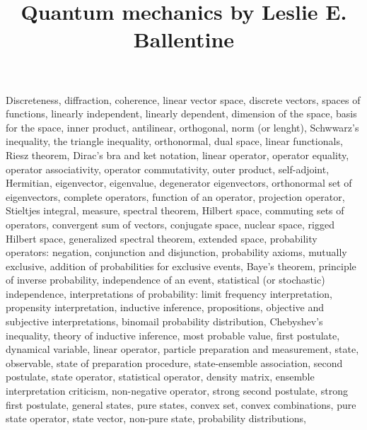 

\usepackage[english]{babel}


\title{Quantum mechanics by Leslie E. Ballentine}



\maketitle

\begin{multicols}{3}
  Discreteness,
  diffraction,
  coherence,
  linear vector space,
  discrete vectors,
  spaces of functions,
  linearly independent,
  linearly dependent,
  dimension of the space,
  basis for the space,
  inner product,
  antilinear,
  orthogonal,
  norm (or lenght),
  Schwwarz's inequality,
  the triangle inequality,
  orthonormal,
  dual space,
  linear functionals,
  Riesz theorem,
  Dirac's bra and ket notation,
  linear operator,
  operator equality,
  operator associativity,
  operator commutativity,
  outer product,
  self-adjoint,
  Hermitian,
  eigenvector,
  eigenvalue,
  degenerator eigenvectors,
  orthonormal set of eigenvectors,
  complete operators,
  function of an operator,
  projection operator,
  Stieltjes integral,
  measure,
  spectral theorem,
  Hilbert space,
  commuting sets of operators,
  convergent sum of vectors,
  conjugate space,
  nuclear space,
  rigged Hilbert space,
  generalized spectral theorem,
  extended space,
  probability operators: negation, conjunction and disjunction,
  probability axioms,
  mutually exclusive,
  addition of probabilities for exclusive events,
  Baye's theorem,
  principle of inverse probability,
  independence of an event,
  statistical (or stochastic) independence,
  interpretations of probability:
  limit frequency interpretation, propensity interpretation,
  inductive inference, propositions, objective and subjective interpretations,
  binomail probability distribution,
  Chebyshev's inequality,
  theory of inductive inference,
  most probable value,
  first postulate,
  dynamical variable,
  linear operator,
  particle preparation and measurement,
  state,
  observable,
  state of preparation procedure,
  state-ensemble association,
  second postulate,
  state operator,
  statistical operator,
  density matrix,
  ensemble interpretation criticism,
  non-negative operator,
  strong second postulate,
  strong first postulate,
  general states,
  pure states,
  convex set,
  convex combinations,
  pure state operator,
  state vector,
  non-pure state,
  probability distributions,

\end{multicols}
